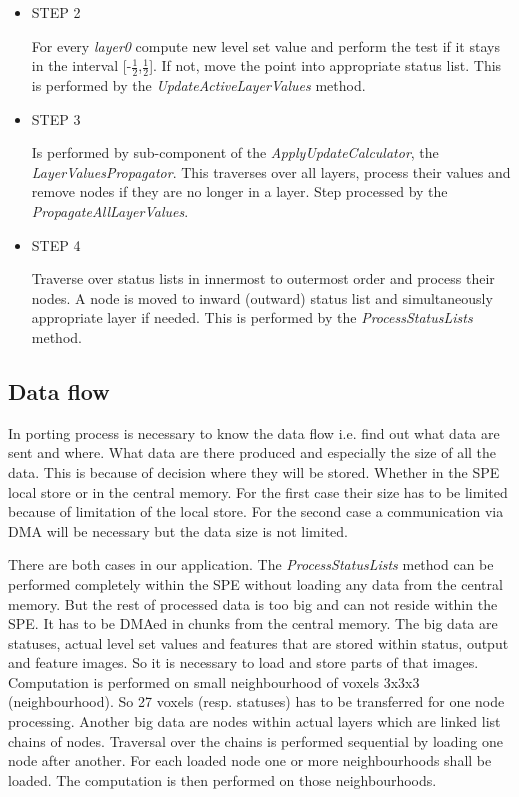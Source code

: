 \begin{itemize}
\item STEP 2
\par
For every \emph{layer0} compute new level set value and perform the test if it stays in the interval [-$\frac{1}{2}$,$\frac{1}{2}$].
If not, move the point into appropriate status list.
This is performed by the \mbox{\emph{UpdateActiveLayerValues}} method.

\item STEP 3
\par
Is performed by sub-component of the \mbox{\emph{ApplyUpdateCalculator}}, the \mbox{\emph{LayerValuesPropagator}}.
This traverses over all layers, process their values and remove nodes if they are no longer in a layer.
Step processed by the \mbox{\emph{PropagateAllLayerValues}}.

\item STEP 4
\par
Traverse over status lists in innermost to outermost order and process their nodes.
A node is moved to inward (outward) status list and simultaneously appropriate layer if needed.
This is performed by the \mbox{\emph{ProcessStatusLists}} method.
\end{itemize}

\subsection{Data flow}

\par
In porting process is necessary to know the data flow i.e. find out what data are sent and where.
What data are there produced and especially the size of all the data.
This is because of decision where they will be stored.
Whether in the SPE local store or in the central memory.
For the first case their size has to be limited because of limitation of the local store.
For the second case a communication via DMA will be necessary but the data size is not limited.

\par
There are both cases in our application.
The \mbox{\emph{ProcessStatusLists}} method can be performed completely within the SPE without loading any data from the central memory.
But the rest of processed data is too big and can not reside within the SPE.
It has to be DMAed in chunks from the central memory.
The big data are statuses, actual level set values and features that are stored within status, output and feature images.
So it is necessary to load and store parts of that images.
Computation is performed on small neighbourhood of voxels 3x3x3 (neighbourhood).
So 27 voxels (resp. statuses) has to be transferred for one node processing.
Another big data are nodes within actual layers which are linked list chains of nodes.
Traversal over the chains is performed sequential by loading one node after another.
For each loaded node one or more neighbourhoods shall be loaded.
The computation is then performed on those neighbourhoods.

